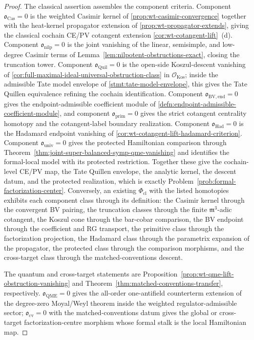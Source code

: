 \documentclass[11pt]{memoir}
\begin{document}
\begin{proof}
  The classical assertion assembles the component criteria.
  Component \(\mathfrak o_{\mathrm{Cas}}=0\) is the weighted Casimir
  kernel of \ref{prop:wt-casimir-convergence} together with the heat-kernel
  propagator extension of \ref{prop:wt-propagator-extends}, giving the
  classical cochain CE/PV cotangent extension
  \ref{cor:wt-cotangent-lift}~(d).  Component \(\mathfrak o_{\mathrm{nilp}}=0\)
  is the joint vanishing of the linear, semisimple, and low-degree
  Casimir terms of Lemma~\ref{lem:nilpotent-obstructions-exact},
  closing the truncation tower.  Component
  \(\mathfrak o_{\mathrm{Quil}}=0\) is the open-side Koszul-descent
  vanishing of \ref{cor:full-maximal-ideal-universal-obstruction-class}
  in \(\mathcal O_{\mathrm{Kos}}\); inside the admissible Tate model
	  envelope of \ref{stmt:tate-model-envelope}, this gives the Tate Quillen
	  equivalence refining the cochain identification.  Component
  \(\mathfrak o_{\mathrm{BV,end}}=0\) gives the endpoint-admissible
  coefficient module of
  \ref{defn:endpoint-admissible-coefficient-module}, and component
  \(\mathfrak o_{\mathrm{prim}}=0\) gives the strict cotangent
  centrality homotopy and the cotangent-label boundary realization.
  Component \(\mathfrak o_{\mathrm{Had}}=0\) is the Hadamard
  endpoint vanishing of \ref{cor:wt-cotangent-lift-hadamard-criterion}.
  Component \(\mathfrak o_{\mathrm{univ}}=0\) gives the protected
  Hamiltonian comparison through
  Theorem~\ref{thm:joint-super-balanced-symp-qme-vanishing} and
  identifies the formal-local model with its protected restriction.
  Together these give the cochain-level CE/PV map, the Tate Quillen
  envelope, the analytic kernel, the descent datum, and the protected
  realization, which is exactly Problem~\ref{prob:formal-factorization-center}.
  Conversely, an existing
  \(\Phi_{\mathrm{cl}}\) with the listed homotopies exhibits each
  component class through its definition: the Casimir kernel through
  the convergent BV pairing, the truncation classes through the
  finite \(\mathfrak m^3\)-adic cotangent, the Koszul cone
  through the bar-cobar comparison, the BV endpoint through the
  coefficient and RG transport, the primitive class through the
  factorization projection, the Hadamard class through the parametrix
  expansion of the propagator, the protected class through the
  comparison morphisms, and the cross-target class through the
  matched-conventions descent.

  The quantum and cross-target statements are
  Proposition~\ref{prop:wt-qme-lift-obstruction-vanishing} and
  Theorem~\ref{thm:matched-conventions-transfer}, respectively.
	      \(\mathfrak o_{\mathrm{QME}}=0\) gives the all-order
	      one-antifield counterterm extension of the degree-zero Moyal/Weyl
	      theorem inside the weighted regulator-admissible sector;
	      \(\mathfrak o_{\mathrm{cv}}=0\) with the
  matched-conventions datum gives the global or cross-target
  factorization-centre morphism whose formal stalk is the local
  Hamiltonian map.
\end{proof}
\end{document}
